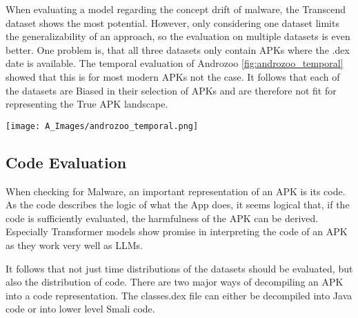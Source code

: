 When evaluating a model regarding the concept drift of malware, 
the Transcend dataset shows the most potential.
However, only considering one dataset limits the generalizability of an approach, 
so the evaluation on multiple datasets is even better.
One problem is, that all three datasets only contain APKs where the .dex date is available.
The temporal evaluation of Androzoo \ref{fig:androzoo_temporal} showed that this is for most 
modern APKs not the case.
It follows that each of the datasets are Biased in their selection of APKs and are 
therefore not fit for representing the True APK landscape. 

\begin{figure*}[b!]
    \centering
    \begin{minipage}{1.5\textwidth}
        \centering
        \texttt{[image: A\_Images/androzoo\_temporal.png]}
        \captionsetup{width=\textwidth}
        \caption{\label{fig:androzoo_temporal}
        Temporal distribution of APKs based on three key attributes: 
        classes.dex metadata, Virustotal Scan, and Androzoo Added. 
        The red bars (classes.dex metadata) show a large spike in 1980 to 1982, 
        likely due to incorrect or missing metadata values. 
        The blue (year of first scan by virustotal on that APK) and 
        green (year this APK was added to the androzoo repository) bars 
        indicate a consistent increase in APK activity from 2010 onward, 
        peaking around 2020 to 2022, reflecting the growing adoption of Android 
        and corresponding malware collection efforts. 
        The discrepancies between attributes highlight potential issues in 
        dataset metadata accuracy and consistency.
        }
    \end{minipage}
\end{figure*}


\subsection{Code Evaluation}

When checking for Malware, an important representation of an APK is its code.
As the code describes the logic of what the App does, it seems logical that, if the 
code is sufficiently evaluated, the harmfulness of the APK can be derived.
Especially Transformer models show promise in interpreting the code of an APK as they work very well as LLMs.

It follows that not just time distributions of the datasets should be evaluated, but also the distribution of code.
There are two major ways of decompiling an APK into a code representation.
The classes.dex file can either be decompiled into Java code or into lower level Smali code.

